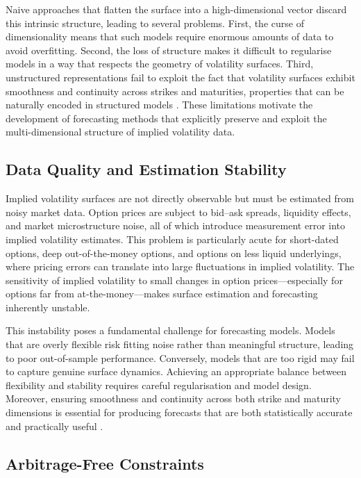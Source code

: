 Naive approaches that flatten the surface into a high-dimensional vector discard this intrinsic structure, leading to several problems. First, the curse of dimensionality means that such models require enormous amounts of data to avoid overfitting. Second, the loss of structure makes it difficult to regularise models in a way that respects the geometry of volatility surfaces. Third, unstructured representations fail to exploit the fact that volatility surfaces exhibit smoothness and continuity across strikes and maturities, properties that can be naturally encoded in structured models \cite{Fen:05,Gat:06}. These limitations motivate the development of forecasting methods that explicitly preserve and exploit the multi-dimensional structure of implied volatility data.

\subsection{Data Quality and Estimation Stability}

Implied volatility surfaces are not directly observable but must be estimated from noisy market data. Option prices are subject to bid--ask spreads, liquidity effects, and market microstructure noise, all of which introduce measurement error into implied volatility estimates. This problem is particularly acute for short-dated options, deep out-of-the-money options, and options on less liquid underlyings, where pricing errors can translate into large fluctuations in implied volatility. The sensitivity of implied volatility to small changes in option prices—especially for options far from at-the-money—makes surface estimation and forecasting inherently unstable.

This instability poses a fundamental challenge for forecasting models. Models that are overly flexible risk fitting noise rather than meaningful structure, leading to poor out-of-sample performance. Conversely, models that are too rigid may fail to capture genuine surface dynamics. Achieving an appropriate balance between flexibility and stability requires careful regularisation and model design. Moreover, ensuring smoothness and continuity across both strike and maturity dimensions is essential for producing forecasts that are both statistically accurate and practically useful \cite{Fen:05,Gat:06}.

\subsection{Arbitrage-Free Constraints}

